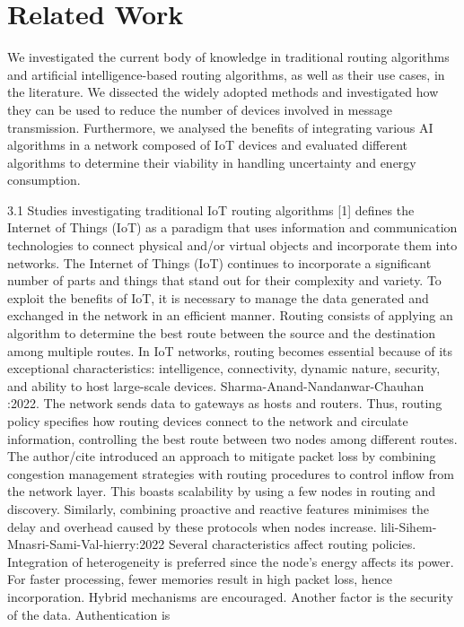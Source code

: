 \section{Related Work}
\label{sec:rel-work}


We investigated the current body of knowledge in traditional routing algorithms and artificial intelligence-based routing 
algorithms, as well as their use cases, in the literature. We dissected the widely adopted methods and investigated how they
can be used to reduce the number of devices involved in message transmission. Furthermore, we analysed the benefits of 
integrating various AI algorithms in a network composed of IoT devices and evaluated different algorithms to determine their 
viability in handling uncertainty and energy consumption.

3.1 Studies investigating traditional IoT routing algorithms [1] defines the Internet of Things (IoT) as a paradigm that uses 
information and communication technologies to connect physical and/or virtual objects and incorporate them into networks. 
The Internet of Things (IoT) continues to incorporate a significant number of parts and things that stand out for their 
complexity and variety. To exploit the benefits of IoT, it is necessary to manage the data generated and exchanged in the 
network in an efficient manner. Routing consists of applying an algorithm to determine the best route between the source and 
the destination among multiple routes. In IoT networks, routing becomes essential because of its exceptional characteristics: 
intelligence, connectivity, dynamic nature, security, and ability to host large-scale devices. Sharma-Anand-Nandanwar-Chauhan
:2022. The network sends data to gateways as hosts and routers. Thus, routing policy specifies how routing devices connect to 
the network and circulate information, controlling the best route between two nodes among different routes. The author/cite 
introduced an approach to mitigate packet loss by combining congestion management strategies with routing procedures to control
 inflow from the network layer. This boasts scalability by using a few nodes in routing and discovery. Similarly, combining 
 proactive and reactive features minimises the delay and overhead caused by these protocols when nodes increase. 
 lili-Sihem-Mnasri-Sami-Val-hierry:2022 Several characteristics affect routing policies. Integration of heterogeneity is 
 preferred since the node’s energy affects its power. For faster processing, fewer memories result in high packet loss, 
 hence incorporation. Hybrid mechanisms are encouraged. Another factor is the security of the data. Authentication is 

